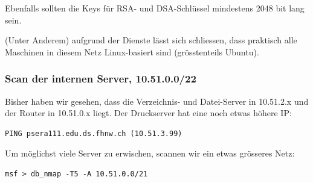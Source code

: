 \documentclass[a4paper,11pt]{scrartcl}
\begin{document}
Ebenfalls sollten die Keys für RSA- und DSA-Schlüssel mindestens 2048 bit lang sein.

(Unter Anderem) aufgrund der Dienste lässt sich schliessen, dass praktisch alle Maschinen in diesem Netz Linux-basiert sind (grösstenteils Ubuntu).

\subsubsection{Scan der internen Server, 10.51.0.0/22}
Bisher haben wir gesehen, dass die Verzeichnis- und Datei-Server in 10.51.2.x und der Router in 10.51.0.x liegt. Der Druckserver hat eine noch etwas höhere IP:
\begin{verbatim}PING psera111.edu.ds.fhnw.ch (10.51.3.99)\end{verbatim}
Um möglichst viele Server zu erwischen, scannen wir ein etwas grösseres Netz:
\begin{verbatim}msf > db_nmap -T5 -A 10.51.0.0/21\end{verbatim}
\end{document}
